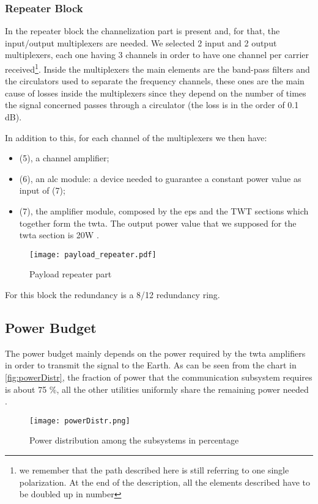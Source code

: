 \subsubsection{Repeater Block}
	In the repeater block the channelization part is present and, for that, the input/output multiplexers are needed. We selected 2 input and 2 output multiplexers, each one having 3 channels in order to have one channel per carrier received\footnote{we remember that the path described here is still referring to one single polarization. At the end of the description, all the elements described have to be doubled up in number}. Inside the multiplexers the main elements are the band-pass filters and the circulators used to separate the frequency channels, these ones are the main cause of losses inside the multiplexers since they depend on the number of times the signal concerned passes through a circulator (the loss is in the order of 0.1 dB). \cite{Maral2017}

In addition to this, for each channel of the multiplexers we then have:
	\begin{itemize}
	\item (5), a channel amplifier;
	\item (6), an \gls{alc} module: a device needed to guarantee a constant power value as input of (7);
	\item (7), the amplifier module, composed by the \gls{eps} and the TWT sections which together form the \gls{twta}. The output power value that we supposed for the \gls{twta} section is 20W \cite{Maral2017}.
	\end{itemize}
	\begin{figure}[h]
		\centering
		\texttt{[image: payload\_repeater.pdf]}
		\caption{Payload repeater part}
		\label{fig:repeater}
	\end{figure}
For this block the redundancy is a 8/12 redundancy ring.

\subsection{Power Budget}
The power budget mainly depends on the power required by the \gls{twta} amplifiers in order to transmit the signal to the Earth. As can be seen from the chart in \autoref{fig:powerDistr}, the fraction of power that the communication subsystem requires is about 75 \%, all the other utilities uniformly share the remaining power needed \cite{Miguel17}.
\begin{figure}[h]
\centering
\texttt{[image: powerDistr.png]}
\caption{Power distribution among the subsystems in percentage}
\label{fig:powerDistr}
\end{figure}
